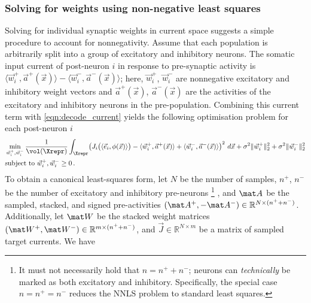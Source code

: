 
\subsubsection{Solving for weights using non-negative least squares}
Solving for individual synaptic weights in current space suggests a simple procedure to account for nonnegativity.
Assume that each population is arbitrarily split into a group of excitatory and inhibitory neurons.
The somatic input current of post-neuron $i$ in response to pre-synaptic activity is $\langle \vec w_i^+, \vec a^+(\vec x) \rangle - \langle \vec w_i^-, \vec a^-(\vec x) \rangle$;
here, $\vec w_i^+$, $\vec w_i^-$ are nonnegative excitatory and inhibitory weight vectors and $\vec a^+(\vec x)$, $\vec a^-(\vec x)$ are the activities of the excitatory and inhibitory neurons in the pre-population.
Combining this current term with \cref{eqn:decode_current} yields the following optimisation problem for each post-neuron $i$
\begin{align}
	\begin{aligned}
	& \min_{{\vec w}_i^+, {\vec w}_i^-}
	\frac{1}{\vol(\Xrepr)} \int_{\Xrepr} \!
	\left(
		J_i\bigl(\langle \vec e_i, \phi(\vec x) \rangle\bigr)
		- \langle \vec w_{i}^+, \vec a^+(\vec x) \rangle
		+ \langle \vec w_{i}^-, \vec a^-(\vec x) \rangle
	\right)^2 \, d\vec x + \sigma^2 \|\vec w_{i}^+\|_2^2 + \sigma^2 \|\vec w_{i}^-\|_2^2 \\
	& \text{subject to } \vec w_i^+, \vec w_i^- \geq 0 \,.
	\end{aligned}
	\label{eqn:decode_nonneg}
\end{align}
To obtain a canonical least-squares form, let $N$ be the number of samples, $n^+$, $n^-$ be the number of excitatory and inhibitory pre-neurons%
\footnote{
It must not necessarily hold that $n = n^+ + n^-$; neurons can \emph{technically} be marked as both excitatory and inhibitory. Specifically, the special case $n = n^+ = n^-$ reduces the NNLS problem to standard least squares.
}%
, and $\mat A$ be the sampled, stacked, and signed pre-activities $(\mat A^+, -\mat A^-) \in \mathbb{R}^{N \times (n^+ + n^-)}$.
Additionally, let $\mat W$ be the stacked weight matrices $(\mat W^+, \mat W^-) \in \mathbb{R}^{m \times (n^+ + n^-)}$, and $\vec J \in \mathbb{R}^{N \times m}$ be a matrix of sampled target currents. We have
